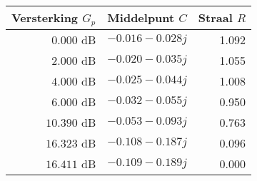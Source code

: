 \begin{tabular}{|r|r|r|} \hline 
\textbf{Versterking $G_p$} & \textbf{Middelpunt $C$} & \textbf{Straal $R$} \\ \hline 
$ 0.000$ \mbox{dB} & $-0.016 -0.028 j$ &  1.092 \\ \hline 
$ 2.000$ \mbox{dB} & $-0.020 -0.035 j$ &  1.055 \\ \hline 
$ 4.000$ \mbox{dB} & $-0.025 -0.044 j$ &  1.008 \\ \hline 
$ 6.000$ \mbox{dB} & $-0.032 -0.055 j$ &  0.950 \\ \hline 
$10.390$ \mbox{dB} & $-0.053 -0.093 j$ &  0.763 \\ \hline 
$16.323$ \mbox{dB} & $-0.108 -0.187 j$ &  0.096 \\ \hline 
$16.411$ \mbox{dB} & $-0.109 -0.189 j$ &  0.000 \\ \hline 
\end{tabular}